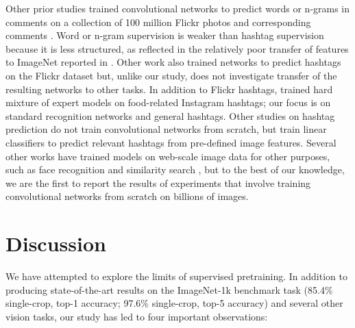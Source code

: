 \documentclass[runningheads]{llncs}
\begin{document}
Other prior studies \cite{joulin2016learning,li2017visualngram} trained convolutional networks to predict words or n-grams in comments on a collection of 100 million Flickr photos and corresponding comments \cite{thomee2016yfcc100m}. Word or n-gram supervision is weaker than hashtag supervision because it is less structured, as reflected in the relatively poor transfer of features to ImageNet reported in \cite{joulin2016learning}. Other work \cite{veit2017separating} also trained networks to predict hashtags on the Flickr dataset but, unlike our study, does not investigate transfer of the resulting networks to other tasks. In addition to Flickr hashtags, \cite{gross2017hard} trained hard mixture of expert models on food-related Instagram hashtags; our focus is on standard recognition networks and general hashtags. Other studies on hashtag prediction \cite{denton2015hashtag} do not train convolutional networks from scratch, but train linear classifiers to predict relevant hashtags from pre-defined image features. Several other works have trained models on web-scale image data for other purposes, such as face recognition \cite{schroff2015facenet,taigman2015webscale} and similarity search \cite{johnson2017billion,stewenius2012size}, but to the best of our knowledge, we are the first to report the results of experiments that involve training convolutional networks from scratch on billions of images.
 \section{Discussion}
\label{sec:discussion}
We have attempted to explore the limits of supervised pretraining. In addition to producing state-of-the-art results on the ImageNet-1k benchmark task (85.4\% single-crop, top-1 accuracy; 97.6\% single-crop, top-5 accuracy) and several other vision tasks, our study has led to four important observations:
\end{document}
